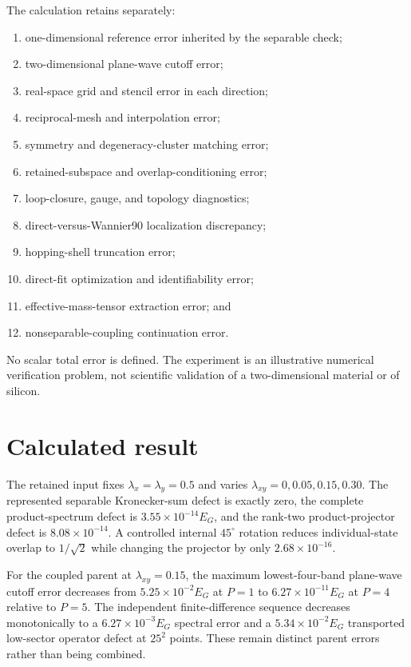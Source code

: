 The calculation retains separately:
\begin{enumerate}
    \item one-dimensional reference error inherited by the separable check;
    \item two-dimensional plane-wave cutoff error;
    \item real-space grid and stencil error in each direction;
    \item reciprocal-mesh and interpolation error;
    \item symmetry and degeneracy-cluster matching error;
    \item retained-subspace and overlap-conditioning error;
    \item loop-closure, gauge, and topology diagnostics;
    \item direct-versus-Wannier90 localization discrepancy;
    \item hopping-shell truncation error;
    \item direct-fit optimization and identifiability error;
    \item effective-mass-tensor extraction error; and
    \item nonseparable-coupling continuation error.
\end{enumerate}
No scalar total error is defined. The experiment is an illustrative numerical
verification problem, not scientific validation of a two-dimensional material
or of silicon.

\section{Calculated result}

The retained input fixes $\lambda_x=\lambda_y=0.5$ and varies
$\lambda_{xy}=0,0.05,0.15,0.30$. The represented separable Kronecker-sum defect
is exactly zero, the complete product-spectrum defect is
$3.55\times10^{-14}E_G$, and the rank-two product-projector defect is
$8.08\times10^{-14}$. A controlled internal $45^\circ$ rotation reduces
individual-state overlap to $1/\sqrt{2}$ while changing the projector by only
$2.68\times10^{-16}$.

For the coupled parent at $\lambda_{xy}=0.15$, the maximum lowest-four-band
plane-wave cutoff error decreases from $5.25\times10^{-2}E_G$ at $P=1$ to
$6.27\times10^{-11}E_G$ at $P=4$ relative to $P=5$. The independent
finite-difference sequence decreases monotonically to a
$6.27\times10^{-3}E_G$ spectral error and a $5.34\times10^{-2}E_G$ transported
low-sector operator defect at $25^2$ points. These remain distinct parent
errors rather than being combined.

